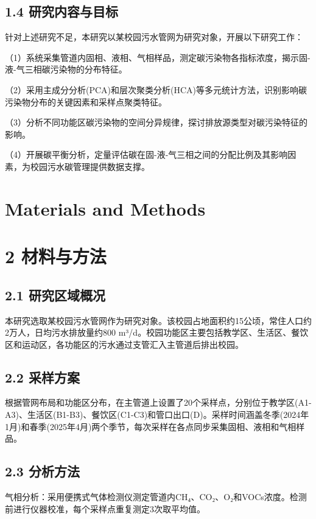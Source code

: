 \documentclass[12pt]{article}
\begin{document}
\subsection{1.4 研究内容与目标}

针对上述研究不足，本研究以某校园污水管网为研究对象，开展以下研究工作：

（1）系统采集管道内固相、液相、气相样品，测定碳污染物各指标浓度，揭示固-液-气三相碳污染物的分布特征。

（2）采用主成分分析(PCA)和层次聚类分析(HCA)等多元统计方法，识别影响碳污染物分布的关键因素和采样点聚类特征。

（3）分析不同功能区碳污染物的空间分异规律，探讨排放源类型对碳污染特征的影响。

（4）开展碳平衡分析，定量评估碳在固-液-气三相之间的分配比例及其影响因素，为校园污水碳管理提供数据支撑。

\section{Materials and Methods}
\label{sec:methods}

\section{2 材料与方法}

\subsection{2.1 研究区域概况}

本研究选取某校园污水管网作为研究对象。该校园占地面积约15公顷，常住人口约2万人，日均污水排放量约800 m³/d。校园功能区主要包括教学区、生活区、餐饮区和运动区，各功能区的污水通过支管汇入主管道后排出校园。

\subsection{2.2 采样方案}

根据管网布局和功能区分布，在主管道上设置了20个采样点，分别位于教学区(A1-A3)、生活区(B1-B3)、餐饮区(C1-C3)和管口出口(D)。采样时间涵盖冬季(2024年1月)和春季(2025年4月)两个季节，每次采样在各点同步采集固相、液相和气相样品。

\subsection{2.3 分析方法}

气相分析：采用便携式气体检测仪测定管道内CH₄、CO₂、O₂和VOCs浓度。检测前进行仪器校准，每个采样点重复测定3次取平均值。
\end{document}
